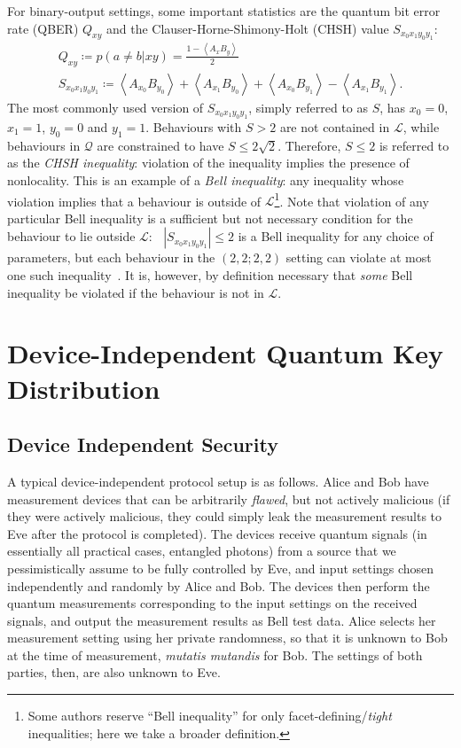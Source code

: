 \documentclass[10pt, a4paper]{article}
\numberwithin{equation}{section} %
\theoremstyle{definition}
\theoremstyle{plain}
\newcommand{\abs}[1]{\mathop{}\left\lvert#1\right\rvert}
\newcommand{\?}{\mathrel{?}} %
\newcommand{\angleb}[1]{\left\langle #1 \right\rangle} %
\newcommand{\Ls}{\mathcal{L}}
\newcommand{\Qs}{\mathcal{Q}}
\begin{document}
    For binary-output settings, some important statistics are the quantum bit error rate (QBER) \(Q_{xy}\) and the Clauser-Horne-Shimony-Holt (CHSH) value \(S_{x_0x_1y_0y_1}\):
    \begin{gather}
      Q_{xy} \coloneqq p(a \neq b|xy) = \frac{1-\angleb{A_x B_y}}{2} \\
      S_{x_0x_1y_0y_1} \coloneqq \angleb{A_{x_0} B_{y_0}} + \angleb{A_{x_1} B_{y_0}} + \angleb{A_{x_0} B_{y_1}} - \angleb{A_{x_1} B_{y_1}}.
    \end{gather}
    The most commonly used version of \(S_{x_0x_1y_0y_1}\), simply referred to as \(S\), has \(x_0=0\), \(x_1=1\), \(y_0=0\) and \(y_1=1\). Behaviours with \(S > 2\) are not contained in \(\Ls\), while behaviours in \(\Qs\) are constrained to have \(S \leq 2\sqrt{2}\). Therefore, \(S \leq 2\) is referred to as the \emph{CHSH inequality}: violation of the inequality implies the presence of nonlocality. This is an example of a \emph{Bell inequality}: any inequality whose violation implies that a behaviour is outside of \(\Ls\)\footnote{Some authors reserve ``Bell inequality'' for only facet-defining/\emph{tight} inequalities; here we take a broader definition.}. Note that violation of any particular Bell inequality is a sufficient but not necessary condition for the behaviour to lie outside \(\Ls\): \(\abs{S_{x_0x_1y_0y_1}} \leq 2\) is a Bell inequality for any choice of parameters, but each behaviour in the \((2,2;2,2)\) setting can violate at most one such inequality~\cite{GeomDecomp}. It is, however, by definition necessary that \emph{some} Bell inequality be violated if the behaviour is not in \(\Ls\).

    \section{Device-Independent Quantum Key Distribution}\label{sec:diqkd}

    \subsection{Device Independent Security}\label{sec:diqkd_di}

    A typical device-independent protocol setup is as follows. Alice and Bob have measurement devices that can be arbitrarily \emph{flawed}, but not actively malicious (if they were actively malicious, they could simply leak the measurement results to Eve after the protocol is completed). The devices receive quantum signals (in essentially all practical cases, entangled photons) from a source that we pessimistically assume to be fully controlled by Eve, and input settings chosen independently and randomly by Alice and Bob. The devices then perform the quantum measurements corresponding to the input settings on the received signals, and output the measurement results as Bell test data. Alice selects her measurement setting using her private randomness, so that it is unknown to Bob at the time of measurement, \emph{mutatis mutandis} for Bob. The settings of both parties, then, are also unknown to Eve.
\end{document}
